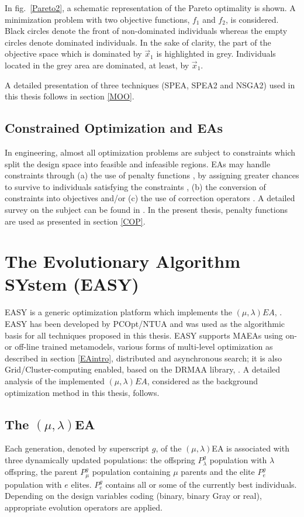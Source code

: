 In fig.\ \ref{Pareto2}, a schematic representation of the Pareto optimality is shown. A minimization problem with two objective functions, $f_1$ and $f_2$, is considered. Black circles denote the front of non-dominated individuals whereas the empty circles denote dominated individuals. In the sake of clarity, the part of the objective space which is dominated by $\vec{x}_1$ is highlighted in grey. Individuals located in the grey area are dominated, at least, by $\vec{x}_1$. 

A detailed presentation of three techniques (SPEA, SPEA2 and NSGA2) used in this thesis follows in section \ref{MOO}.

\subsection{Constrained Optimization and EAs}
\label{COPini}
In engineering, almost all optimization problems are subject to constraints which split the design space into feasible and infeasible regions. EAs may handle constraints through (a) the use of penalty functions \cite{Deb00,morales98}, by assigning greater chances to survive to individuals satisfying the constraints \cite{powell93}, (b) the conversion of constraints into objectives \cite{surry95,surry97} and/or (c) the use of correction operators \cite{mich94}. A detailed survey on the subject can be found in \cite{mich96,coello02}. In the present thesis, penalty functions are used as presented in section \ref{COP}. 

\section{The Evolutionary Algorithm SYstem (EASY)}
\label{EASY_def}
EASY is a generic optimization platform which implements the $(\mu,\lambda)EA$, \cite{phd_Giotis,phd_Karakasis,phd_Kampolis,EASYsite}. EASY has been developed by PCOpt/NTUA and was used as the algorithmic basis for all techniques proposed in this thesis. EASY supports MAEAs using on- or off-line trained metamodels, various forms of multi-level optimization as described in section \ref{EAintro}, distributed and asynchronous search; it is also Grid/Cluster-computing enabled, based on the DRMAA library, \cite{phd_Liakopoulos}. A detailed analysis of the implemented $(\mu,\lambda)EA$, considered as the background optimization method in this thesis, follows.  


\subsection{The $(\mu,\lambda)$EA}
\label{MLEA}
Each generation, denoted by superscript $g$, of the $(\mu,\lambda)$EA is associated with three dynamically updated populations: the offspring $P_{\lambda}^g$ population with $\lambda$ offspring, the parent $P_{\mu}^g$ population containing $\mu$ parents and the elite $P_{e}^g$ population with $e$ elites. $P_{e}^g$ contains all or some of the currently best individuals. Depending on the design variables coding (binary, binary Gray or real), appropriate evolution operators are applied. 

